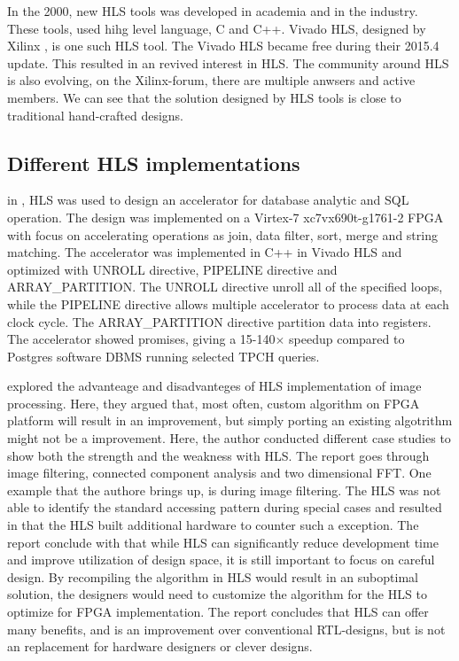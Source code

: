 In the 2000, new HLS tools was developed in academia and in the industry. These tools, used hihg level language, C and C++. Vivado HLS, designed by Xilinx \citep{6409453}, is one such HLS tool. The Vivado HLS became free during their 2015.4 update\citep{VIVADOHLS}. This resulted in an revived interest in HLS. The community around HLS is also evolving, on the Xilinx-forum, there are multiple anwsers and active members. We can see that the solution designed by HLS tools is close to traditional hand-crafted designs\citep{6718388}.

\subsection{Different HLS implementations}
in \citep{Malazgirt:2015:HLS:2889287.2889299}, HLS was used to design an accelerator for database analytic and SQL operation. The design was implemented on a Virtex-7 xc7vx690t-g1761-2 FPGA with focus on accelerating operations as join, data filter, sort, merge and string matching. The accelerator was implemented in C++ in Vivado HLS and optimized with UNROLL directive, PIPELINE directive and ARRAY\_PARTITION. The UNROLL directive unroll all of the specified loops, while the PIPELINE directive allows multiple accelerator to process data at each clock cycle. The ARRAY\_PARTITION directive partition data into registers.  The accelerator showed promises, giving a 15-140$\times$ speedup compared to Postgres software DBMS running selected TPC\-H queries. 

\cite{Bailey:2015:ALH:2789116.2789145} explored the advanteage and disadvanteges of HLS implementation of image processing. Here, they argued that, most often, custom algorithm on FPGA platform will result in an improvement, but simply porting an existing algotrithm might not be a improvement. Here, the author conducted different case studies to show both the strength and the weakness with HLS. The report goes through image filtering, connected component analysis and two dimensional FFT. One example that the authore brings up, is during image filtering. The HLS was not able to identify the standard accessing pattern during special cases and resulted in that the HLS built additional hardware to counter such a exception. The report conclude with that while HLS can significantly reduce development time and improve utilization of design space, it is still important to focus on careful design. 
By recompiling the algorithm in HLS would result in an suboptimal solution, the designers would need to customize the algorithm for the HLS to optimize for FPGA implementation. The report concludes that HLS can offer many benefits, and is an improvement over conventional RTL-designs, but is not an replacement for hardware designers or clever designs. 


